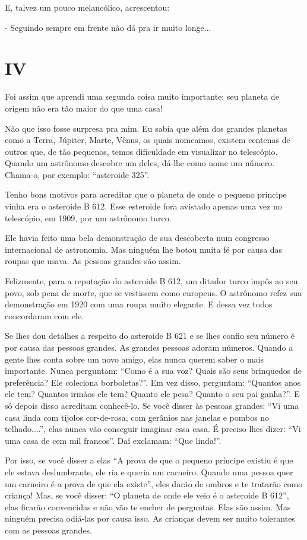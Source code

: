 E, talvez um pouco melancólico, acrescentou:

- Seguindo sempre em frente não dá pra ir muito longe...

\chapter{IV}

Foi assim que aprendi uma segunda coisa muito importante: seu planeta de
origem não era tão maior do que uma casa!

Não que isso fosse surpresa pra mim. Eu sabia que além dos grandes
planetas como a Terra, Júpiter, Marte, Vênus, os quais nomeamos, existem
centenas de outros que, de tão pequenos, temos dificuldade em visualizar
no telescópio. Quando um astrônomo descobre um deles, dá-lhe como nome
um número. Chama-o, por exemplo: ``asteroide 325''.

Tenho bons motivos para acreditar que o planeta de onde o pequeno
príncipe vinha era o asteroide B 612. Esse esteroide fora avistado
apenas uma vez no telescópio, em 1909, por um astrônomo turco.

Ele havia feito uma bela demonstração de sua descoberta num congresso
internacional de astronomia. Mas ninguém lhe botou muita fé por causa
das roupas que usava. As pessoas grandes são assim.

Felizmente, para a reputação do asteroide B 612, um ditador turco impôs
ao seu povo, sob pena de morte, que se vestissem como europeus. O
astrônomo refez sua demonstração em 1920 com uma roupa muito elegante. E
dessa vez todos concordaram com ele.

Se lhes dou detalhes a respeito do asteroide B 621 e se lhes confio seu
número é por causa das pessoas grandes. As grandes pessoas adoram
números. Quando a gente lhes conta sobre um novo amigo, elas nunca
querem saber o mais importante. Nunca perguntam: ``Como é a sua voz?
Quais são seus brinquedos de preferência? Ele coleciona borboletas?''.
Em vez disso, perguntam: ``Quantos anos ele tem? Quantos irmãos ele tem?
Quanto ele pesa? Quanto o seu pai ganha?''. E só depois disso acreditam
conhecê-lo. Se você disser às pessoas grandes: ``Vi uma casa linda com
tijolos cor-de-rosa, com gerânios nas janelas e pombos no telhado....'',
elas nunca vão conseguir imaginar essa casa. É preciso lhes dizer: ``Vi
uma casa de cem mil francos''. Daí exclamam: ``Que linda!''.

Por isso, se você disser a elas ``A prova de que o pequeno príncipe
existiu é que ele estava deslumbrante, ele ria e queria um carneiro.
Quando uma pessoa quer um carneiro é a prova de que ela existe'', eles
darão de ombros e te tratarão como criança! Mas, se você disser: ``O
planeta de onde ele veio é o asteroide B 612'', elas ficarão convencidas
e não vão te encher de perguntas. Elas são assim. Mas ninguém precisa
odiá-las por causa isso. As crianças devem ser muito tolerantes com as
pessoas grandes.

